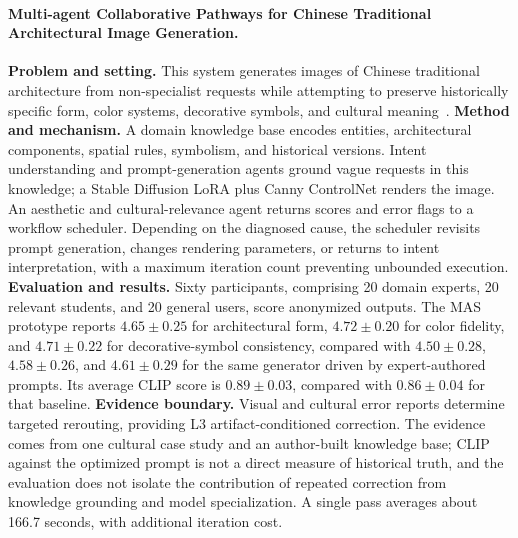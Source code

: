 \paragraph{Multi-agent Collaborative Pathways for Chinese Traditional Architectural Image Generation.}
\textbf{Problem and setting.} This system generates images of Chinese traditional architecture from non-specialist requests while attempting to preserve historically specific form, color systems, decorative symbols, and cultural meaning~\cite{avgdoi101038s41598025181307}. \textbf{Method and mechanism.} A domain knowledge base encodes entities, architectural components, spatial rules, symbolism, and historical versions. Intent understanding and prompt-generation agents ground vague requests in this knowledge; a Stable Diffusion LoRA plus Canny ControlNet renders the image. An aesthetic and cultural-relevance agent returns scores and error flags to a workflow scheduler. Depending on the diagnosed cause, the scheduler revisits prompt generation, changes rendering parameters, or returns to intent interpretation, with a maximum iteration count preventing unbounded execution. \textbf{Evaluation and results.} Sixty participants, comprising 20 domain experts, 20 relevant students, and 20 general users, score anonymized outputs. The MAS prototype reports $4.65\pm0.25$ for architectural form, $4.72\pm0.20$ for color fidelity, and $4.71\pm0.22$ for decorative-symbol consistency, compared with $4.50\pm0.28$, $4.58\pm0.26$, and $4.61\pm0.29$ for the same generator driven by expert-authored prompts. Its average CLIP score is $0.89\pm0.03$, compared with $0.86\pm0.04$ for that baseline. \textbf{Evidence boundary.} Visual and cultural error reports determine targeted rerouting, providing L3 artifact-conditioned correction. The evidence comes from one cultural case study and an author-built knowledge base; CLIP against the optimized prompt is not a direct measure of historical truth, and the evaluation does not isolate the contribution of repeated correction from knowledge grounding and model specialization. A single pass averages about 166.7 seconds, with additional iteration cost.

